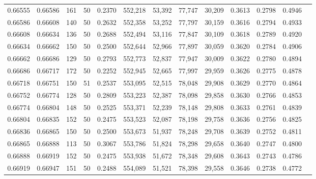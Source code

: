 \begin{tabular}{rrrrrrrrrrrrr}
0.66555 & 0.66586 &   161 &  50 &                                     0.2370 & 552,218 &  53,392 &  77,747 &  30,209 & 0.3613 & 0.2798 & 0.4946 \\
0.66586 & 0.66608 &   140 &  50 &                                     0.2632 & 552,358 &  53,252 &  77,797 &  30,159 & 0.3616 & 0.2794 & 0.4933 \\
0.66608 & 0.66634 &   136 &  50 &                                     0.2688 & 552,494 &  53,116 &  77,847 &  30,109 & 0.3618 & 0.2789 & 0.4920 \\
0.66634 & 0.66662 &   150 &  50 &                                     0.2500 & 552,644 &  52,966 &  77,897 &  30,059 & 0.3620 & 0.2784 & 0.4906 \\
0.66662 & 0.66686 &   129 &  50 &                                     0.2793 & 552,773 &  52,837 &  77,947 &  30,009 & 0.3622 & 0.2780 & 0.4894 \\
0.66686 & 0.66717 &   172 &  50 &                                     0.2252 & 552,945 &  52,665 &  77,997 &  29,959 & 0.3626 & 0.2775 & 0.4878 \\
0.66718 & 0.66751 &   150 &  51 &                                     0.2537 & 553,095 &  52,515 &  78,048 &  29,908 & 0.3629 & 0.2770 & 0.4864 \\
0.66752 & 0.66774 &   128 &  50 &                                     0.2809 & 553,223 &  52,387 &  78,098 &  29,858 & 0.3630 & 0.2766 & 0.4853 \\
0.66774 & 0.66804 &   148 &  50 &                                     0.2525 & 553,371 &  52,239 &  78,148 &  29,808 & 0.3633 & 0.2761 & 0.4839 \\
0.66804 & 0.66835 &   152 &  50 &                                     0.2475 & 553,523 &  52,087 &  78,198 &  29,758 & 0.3636 & 0.2756 & 0.4825 \\
0.66836 & 0.66865 &   150 &  50 &                                     0.2500 & 553,673 &  51,937 &  78,248 &  29,708 & 0.3639 & 0.2752 & 0.4811 \\
0.66865 & 0.66888 &   113 &  50 &                                     0.3067 & 553,786 &  51,824 &  78,298 &  29,658 & 0.3640 & 0.2747 & 0.4800 \\
0.66888 & 0.66919 &   152 &  50 &                                     0.2475 & 553,938 &  51,672 &  78,348 &  29,608 & 0.3643 & 0.2743 & 0.4786 \\
0.66919 & 0.66947 &   151 &  50 &                                     0.2488 & 554,089 &  51,521 &  78,398 &  29,558 & 0.3646 & 0.2738 & 0.4772 \\

\end{tabular}
